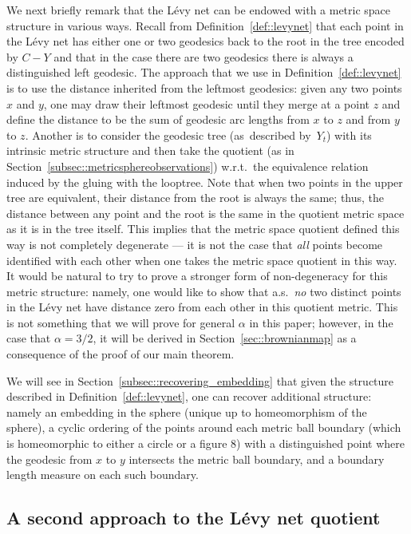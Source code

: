 \documentclass[10pt]{amsart}
\theoremstyle{plain}
\numberwithin{theorem}{section}
\theoremstyle{definition}
\begin{document}
We next briefly remark that the Lévy net can be endowed with a metric space structure in various ways. Recall from Definition~\ref{def::levynet} that each point in the Lévy net has either one or two geodesics back to the root in the tree encoded by $C-Y$ and that in the case there are two geodesics there is always a distinguished left geodesic. The approach that we use in Definition~\ref{def::levynet} is to use the distance inherited from the leftmost geodesics: given any two points $x$ and $y$, one may draw their leftmost geodesic until they merge at a point $z$ and define the distance to be the sum of geodesic arc lengths from $x$ to $z$ and from $y$ to $z$. Another is to consider the geodesic tree (as~described by~$Y_t$) with its intrinsic metric structure and then take the quotient (as in Section~\ref{subsec::metricsphereobservations}) w.r.t.\ the equivalence relation induced by the gluing with the looptree. Note that when two points in the upper tree are equivalent, their distance from the root is always the same; thus, the distance between any point and the root is the same in the quotient metric space as it is in the tree itself. This implies that the metric space quotient defined this way is not completely degenerate --- \ie it is not the case that \emph{all} points become identified with each other when one takes the metric space quotient in this way. It would be natural to try to prove a stronger form of non-degeneracy for this metric structure: namely, one would like to show that a.s.\ \emph{no} two distinct points in the Lévy net have distance zero from each other in this quotient metric. This is not something that we will prove for general $\alpha$ in this paper; however, in the case that $\alpha = 3/2$, it will be derived in Section~\ref{sec::brownianmap} as a consequence of the proof of our main theorem.

We will see in Section~\ref{subsec::recovering_embedding} that given the structure described in Definition~\ref{def::levynet}, one can recover additional structure: namely an embedding in the sphere (unique up to homeomorphism of the sphere), a cyclic ordering of the points around each metric ball boundary (which is homeomorphic to either a circle or a figure $8$) with a distinguished point where the geodesic from $x$ to $y$ intersects the metric ball boundary, and a boundary length measure on each such boundary.

\subsection{A second approach to the Lévy net quotient}
\label{subsec::levynet_second_construction}
\end{document}
